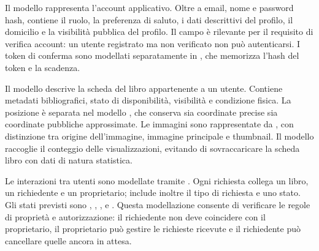 Il modello  rappresenta l'account applicativo. Oltre a email, nome e password hash, contiene il ruolo, la preferenza di saluto, i dati descrittivi del profilo, il domicilio e la visibilità pubblica del profilo. Il campo  è rilevante per il requisito di verifica account: un utente registrato ma non verificato non può autenticarsi. I token di conferma sono modellati separatamente in , che memorizza l'hash del token e la scadenza.

Il modello  descrive la scheda del libro appartenente a un utente. Contiene metadati bibliografici, stato di disponibilità, visibilità e condizione fisica. La posizione è separata nel modello , che conserva sia coordinate precise sia coordinate pubbliche approssimate. Le immagini sono rappresentate da , con distinzione tra origine dell'immagine, immagine principale e thumbnail. Il modello  raccoglie il conteggio delle visualizzazioni, evitando di sovraccaricare la scheda libro con dati di natura statistica.

Le interazioni tra utenti sono modellate tramite . Ogni richiesta collega un libro, un richiedente e un proprietario; include inoltre il tipo di richiesta e uno stato. Gli stati previsti sono , , ,  e . Questa modellazione consente di verificare le regole di proprietà e autorizzazione: il richiedente non deve coincidere con il proprietario, il proprietario può gestire le richieste ricevute e il richiedente può cancellare quelle ancora in attesa.

